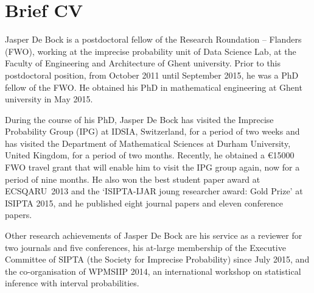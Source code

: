 \documentclass[11pt,a4paper,sans]{moderncv}
\begin{document}
\renewcommand*{\cventry}[6]{%
  \cvline{#1}{%
    {\scshape#2}%
    \ifx#3\else{, {\slshape#3}}\fi%
    \ifx#4\else{, #4}\fi%
    \ifx#5\else{, #5}\fi%
    .%
    \ifx#6\else{\newline{}\begin{minipage}[t]{\linewidth}\small#6\end{minipage}}\fi
}}%


\maketitle

\vspace{-55pt}

\section{Brief CV}
\vspace{4pt}

Jasper De Bock is a postdoctoral fellow of the Research Roundation -- Flanders (FWO), working at the imprecise probability unit of Data Science Lab, at the Faculty of Engineering and Architecture of Ghent university. Prior to this postdoctoral position, from October 2011 until September 2015, he was a PhD fellow of the FWO. He obtained his PhD in mathematical engineering at Ghent university in May 2015.

\hspace{17pt}During the course of his PhD, Jasper De Bock has visited the Imprecise Probability Group (IPG) at IDSIA, Switzerland, for a period of two weeks and has visited the Department of Mathematical Sciences at Durham University, United Kingdom, for a period of two months. Recently, he obtained a \euro{}15000 FWO travel grant that will enable him to visit the IPG group again, now for a period of nine months. He also won the best student paper award at ECSQARU~2013 and the `ISIPTA-IJAR joung researcher award: Gold Prize' at ISIPTA 2015, and he published eight journal papers and eleven conference papers.

\hspace{17pt}Other research achievements of Jasper De Bock are his service as a reviewer for two journals and five conferences, his at-large membership of the Executive Committee of SIPTA (the Society for Imprecise Probability) since July 2015, and the co-organisation of WPMSIIP 2014, an international workshop on statistical inference with interval probabilities.
\end{document}
